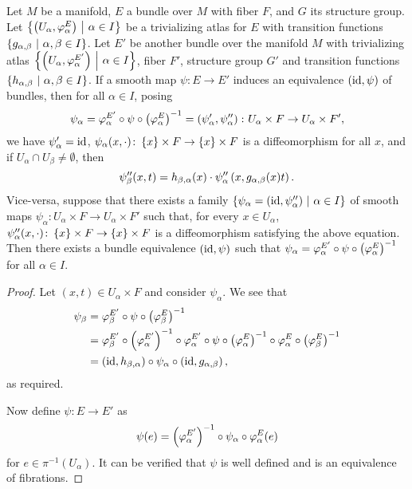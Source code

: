 \begin{trditev}
Let $M$ be a manifold, $E$ a bundle over $M$ with fiber $F$, and
$G$ its structure group. Let
$\left\{\left(U_\alpha, \varphi_\alpha^E\right)~\middle\vert~\alpha \in I\right\}$ be a
trivializing atlas for $E$ with transition functions
$\left\{g_{\alpha, \beta}~\middle\vert~\alpha, \beta \in I\right\}$. Let $E'$ be
another bundle over the manifold $M$ with trivializing atlas
$\left\{\left(U_\alpha, \varphi_\alpha^{E'}\right)~\middle\vert~\alpha \in I\right\}$, fiber
$F'$, structure group $G'$ and transition functions
$\left\{h_{\alpha, \beta}~\middle\vert~\alpha, \beta \in I\right\}$. If a smooth map
$\psi \colon E \to E'$ induces an equivalence $(\operatorname{id}, \psi)$ of
bundles, then for all $\alpha \in I$, posing
\[
\psi_\alpha =
\varphi_\alpha^{E'} \circ \psi \circ \left(\varphi_\alpha^E\right)^{-1} =
\left(\psi_\alpha', \psi_\alpha''\right) \colon
U_\alpha \times F \to U_\alpha \times F',
\]
we have $\psi_\alpha' = \operatorname{id}$,
$\psi_\alpha(x, \cdot) \colon
\left\{x\right\} \times F \to \left\{x\right\} \times F$
is a diffeomorphism for all $x$, and if
$U_\alpha \cap U_\beta \ne \emptyset$, then
\[
\psi_\beta''(x,t) =
h_{\beta, \alpha}(x) \cdot
\psi_\alpha'' \left(x, g_{\alpha, \beta}(x) t\right).
\]
Vice-versa, suppose that there exists a family
$\left\{\psi_\alpha = \left(\operatorname{id}, \psi_\alpha''\right)~\middle\vert~\alpha \in I\right\}$ of
smooth maps
$\psi_\alpha \colon U_\alpha \times F \to U_\alpha \times F'$ such
that, for every $x \in U_\alpha$,
$\psi_\alpha''(x, \cdot) \colon
\left\{x\right\} \times F \to \left\{x\right\} \times F$ is a diffeomorphism
satisfying the above equation. Then there exists a bundle
equivalence $(\operatorname{id}, \psi)$ such that
$\psi_\alpha =
\varphi_\alpha^{E'} \circ \psi \circ \left(\varphi_\alpha^E\right)^{-1}$
for all $\alpha \in I$.
\end{trditev}

\begin{proof}
Let $(x, t) \in U_\alpha  \times F$ and consider $\psi_\alpha$. We
see that
\begin{align*}
\psi_\beta &=
\varphi_\beta^{E'} \circ \psi \circ \left(\varphi_\beta^E\right)^{-1}
\\
&=
\varphi_\beta^{E'} \circ \left(\varphi_\alpha^{E'}\right)^{-1} \circ
\varphi_\alpha^{E'} \circ \psi \circ
\left(\varphi_\alpha^E\right)^{-1} \circ \varphi_\alpha^E \circ
\left(\varphi_\beta^E\right)^{-1}
\\
&=
\left(\operatorname{id}, h_{\beta, \alpha}\right) \circ \psi_\alpha \circ
\left(\operatorname{id}, g_{\alpha, \beta}\right),
\end{align*}
as required.

Now define $\psi \colon E \to E'$ as
\[
\psi(e) =
\left(\varphi_\alpha^{E'}\right)^{-1} \circ \psi_\alpha \circ
\varphi_\alpha^E(e)
\]
for $e \in \pi^{-1}(U_\alpha)$. It can be verified that $\psi$ is
well defined and is an equivalence of fibrations.
\end{proof}

